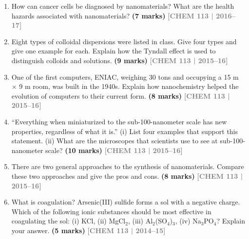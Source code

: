 \documentclass[12pt,a3paper]{article}
\newcommand{\yr}[1]{\hfill\textcolor{gray}{\small\textbf{[#1]}}}
\newcommand{\mk}[1]{\textcolor{orange!70!black}{\small\textbf{(#1 marks)}}}
\begin{document}
\begin{enumerate}
\item How can cancer cells be diagnosed by nanomaterials? What are the health hazards associated with nanomaterials? \mk{7}
\yr{CHEM 113 | 2016--17}




\item Eight types of colloidal dispersions were listed in class. Give four types and give one example for each. Explain how the Tyndall effect is used to distinguish colloids and solutions. \mk{9}
\yr{CHEM 113 | 2015--16}




\item One of the first computers, ENIAC, weighing 30 tons and occupying a 15 m $\times$ 9 m room, was built in the 1940s. Explain how nanochemistry helped the evolution of computers to their current form. \mk{8}
\yr{CHEM 113 | 2015--16}




\item ``Everything when miniaturized to the sub-100-nanometer scale has new properties, regardless of what it is.'' (i) List four examples that support this statement. (ii) What are the microscopes that scientists use to see at sub-100-nanometer scale? \mk{10}
\yr{CHEM 113 | 2015--16}




\item There are two general approaches to the synthesis of nanomaterials. Compare these two approaches and give the pros and cons. \mk{8}
\yr{CHEM 113 | 2015--16}




\item What is coagulation? Arsenic(III) sulfide forms a sol with a negative charge. Which of the following ionic substances should be most effective in coagulating the sol: (i) KCl, (ii) MgCl$_2$, (iii) Al$_2$(SO$_4$)$_3$, (iv) Na$_3$PO$_4$? Explain your answer. \mk{5}
\yr{CHEM 113 | 2014--15}





\end{enumerate}
\newpage
\end{document}
